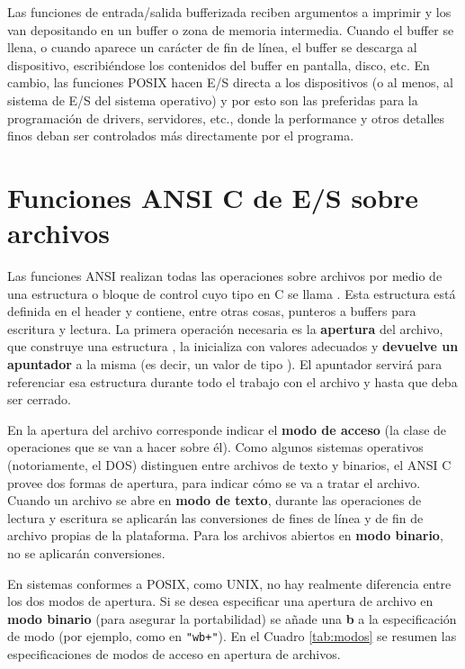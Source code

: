 Las funciones de entrada/salida bufferizada reciben argumentos a imprimir y
los van depositando en un buffer o zona de memoria intermedia.
Cuando el buffer se llena, o cuando aparece un carácter de fin de línea, el
buffer se descarga al dispositivo, escribiéndose los contenidos del buffer en
pantalla, disco, etc. En cambio, las funciones POSIX hacen E/S 
directa a los dispositivos (o al menos, al sistema de E/S del sistema
operativo) y por esto son las preferidas para la programación de drivers,
servidores, etc., donde la performance y otros detalles finos deban ser
controlados más directamente por el programa.

\section{Funciones ANSI C de E/S sobre archivos}
\label{subsec:esarchivosansic}
Las funciones ANSI realizan todas las operaciones sobre archivos por medio de
una estructura o bloque de control cuyo tipo en C se llama . Esta
estructura está definida en el header  y contiene, entre otras cosas,
punteros a buffers para escritura y lectura. La primera operación necesaria es
la \textbf{apertura} del archivo, que construye una estructura , la inicializa con
valores adecuados y \textbf{devuelve un apuntador} a la misma (es decir, un valor de tipo ). El apuntador servirá para
referenciar esa estructura durante todo el trabajo con el archivo y hasta que deba ser
cerrado.

En la apertura del archivo corresponde indicar el \textbf{modo de acceso} (la clase de
operaciones que se van a hacer sobre él). Como algunos sistemas operativos
(notoriamente, el DOS) distinguen entre archivos de texto y binarios, el ANSI C
provee dos formas de apertura, para indicar cómo se va a tratar el archivo.
Cuando un archivo se abre en \textbf{modo de texto}, durante las operaciones de lectura
y escritura se aplicarán las conversiones de fines de línea y de fin de archivo
propias de la plataforma. Para los archivos abiertos en \textbf{modo binario}, no se
aplicarán conversiones.

En sistemas conformes a POSIX, como UNIX, no hay realmente diferencia entre los
dos modos de apertura. Si se desea especificar una apertura de archivo en \textbf{modo
binario} (para asegurar la portabilidad) se añade una \textbf{b} a la especificación de
modo (por ejemplo, como en \lstinline{"wb+"}). En el Cuadro \ref{tab:modos} se resumen las especificaciones de modos de acceso en apertura de archivos. 

